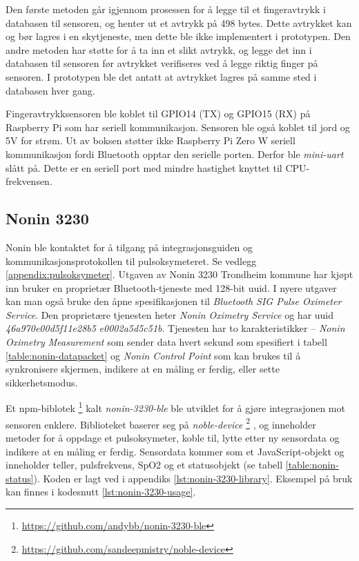 Den første metoden går igjennom prosessen for å legge til et fingeravtrykk i databasen til sensoren, og henter ut et avtrykk
på 498 bytes. Dette avtrykket kan og bør lagres i en skytjeneste, men dette ble ikke implementert i prototypen.
Den andre metoden har støtte for å ta inn et slikt avtrykk, og legge det inn i databasen til sensoren før avtrykket
verifiseres ved å legge riktig finger på sensoren. I prototypen ble det antatt at avtrykket lagres på samme sted i databasen hver gang.

Fingeravtrykksensoren ble koblet til GPIO14 (TX) og GPIO15 (RX) på Raspberry Pi som har seriell kommunikasjon. Sensoren ble også koblet til jord
og 5V for strøm. Ut av boksen støtter ikke Raspberry Pi Zero W seriell kommunikasjon fordi Bluetooth opptar den serielle porten.
Derfor ble \textit{mini-uart} slått på. Dette er en seriell port med mindre hastighet knyttet til CPU-frekvensen.

\subsection{Nonin 3230}
Nonin ble kontaktet for å tilgang på integrasjonsguiden og kommunikasjonsprotokollen til pulsoksymeteret.
Se vedlegg \ref{appendix:pulsoksymeter}.
Utgaven av Nonin 3230 Trondheim kommune har kjøpt inn bruker en proprietær Bluetooth-tjeneste med 128-bit \gls{uuid}.
I nyere utgaver kan man også bruke den åpne spesifikasjonen til \textit{Bluetooth SIG Pulse Oximeter Service}.
Den proprietære tjenesten heter \textit{Nonin Oximetry Service} og har \gls{uuid} \textit{46a970e00d5f11e28b5}\newline
\textit{e0002a5d5c51b}.
Tjenesten har to karakteristikker -- \textit{Nonin Oximetry Measurement} som sender data hvert sekund som spesifiert
i tabell \ref{table:nonin-datapacket} og \textit{Nonin Control Point} som kan brukes til å synkronisere skjermen,
indikere at en måling er ferdig, eller sette sikkerhetsmodus. 

Et \gls{npm}-biblotek \footnote{\url{https://github.com/andybb/nonin-3230-ble}} kalt \textit{nonin-3230-ble} ble utviklet
for å gjøre integrasjonen mot sensoren enklere.
Biblioteket baserer seg på \textit{noble-device} \footnote{\url{https://github.com/sandeepmistry/noble-device}}
, og inneholder metoder for å oppdage et pulsoksymeter,
koble til, lytte etter ny sensordata og indikere at en måling er ferdig. Sensordata kommer som et JavaScript-objekt
og inneholder teller, pulsfrekvens, SpO2 og et statusobjekt (se tabell \ref{table:nonin-status}).
Koden er lagt ved i appendiks \ref{lst:nonin-3230-library}.
Eksempel på bruk kan finnes i kodesnutt \ref{lst:nonin-3230-usage}.

